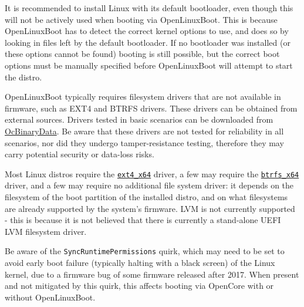 \documentclass[]{article}
\begin{document}
It is recommended to install Linux with its default bootloader, even though this will not be actively used
when booting via OpenLinuxBoot. This is because OpenLinuxBoot has to detect the correct kernel options to
use, and does so by looking in files left by the default bootloader. If no bootloader was installed (or
these options cannot be found) booting is still possible, but the correct boot options must be manually
specified before OpenLinuxBoot will attempt to start the distro.

OpenLinuxBoot typically requires filesystem drivers that are not available in
firmware, such as EXT4 and BTRFS drivers. These drivers can be obtained from external sources.
Drivers tested in basic scenarios can be downloaded from \href{https://github.com/acidanthera/OcBinaryData}{OcBinaryData}.
Be aware that these drivers are not tested for reliability in all scenarios, nor did they undergo
tamper-resistance testing, therefore they may carry potential security or data-loss risks.

Most Linux distros require the \href{https://github.com/acidanthera/OcBinaryData}{\texttt{ext4\_x64}} driver,
a few may require the \href{https://github.com/acidanthera/OcBinaryData}{\texttt{btrfs\_x64}} driver, and a few
may require no additional file system driver: it depends on the filesystem of the boot partition of the installed
distro, and on what filesystems are already supported by the system's firmware. LVM is not currently
supported - this is because it is not believed that there is currently a stand-alone UEFI LVM filesystem driver.

Be aware of the \texttt{SyncRuntimePermissions} quirk, which may need to be set to avoid early boot
failure (typically halting with a black screen) of the Linux kernel, due to a firmware bug of some
firmware released after 2017. When present and not mitigated by this quirk, this affects booting
via OpenCore with or without OpenLinuxBoot.
\end{document}
